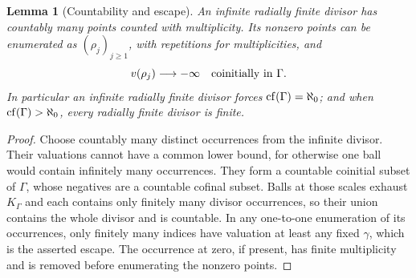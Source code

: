 \documentclass[11pt]{article}
\theoremstyle{plain}
\newtheorem{lemma}[lemma]{Lemma}
\theoremstyle{plain}
\theoremstyle{plain}
\theoremstyle{definition}
\theoremstyle{definition}
\theoremstyle{definition}
\theoremstyle{definition}
\theoremstyle{remark}
\newcommand{\K}{K_\Gamma}\newcommand{\KD}{K_\Delta}
\begin{document}
\begin{lemma}[Countability and escape]\label{ent:lem:divisor-countable}
An infinite radially finite divisor has countably many points counted with
multiplicity. Its nonzero points can be enumerated as $(\rho_j)_{j\ge1}$,
with repetitions for multiplicities, and
\[
 v(\rho_j)\longrightarrow-\infty \quad\hbox{coinitially in }\Gamma.
\]
In particular an infinite radially finite divisor forces
$\operatorname{cf}(\Gamma)=\aleph_0$; and when $\operatorname{cf}(\Gamma)>\aleph_0$, every radially
finite divisor is finite.
\end{lemma}
\begin{proof}
Choose countably many distinct occurrences from the infinite divisor. Their
valuations cannot have a common lower bound, for otherwise one ball would
contain infinitely many occurrences. They form a countable coinitial subset
of $\Gamma$, whose negatives are a countable cofinal subset. Balls at those
scales exhaust $\K$ and each contains only finitely many divisor
occurrences, so their union contains the whole divisor and is countable. In
any one-to-one enumeration of its occurrences, only finitely many indices
have valuation at least any fixed $\gamma$, which is the asserted escape. The
occurrence at zero, if present, has finite multiplicity and is removed before
enumerating the nonzero points.
\end{proof}
\end{document}
